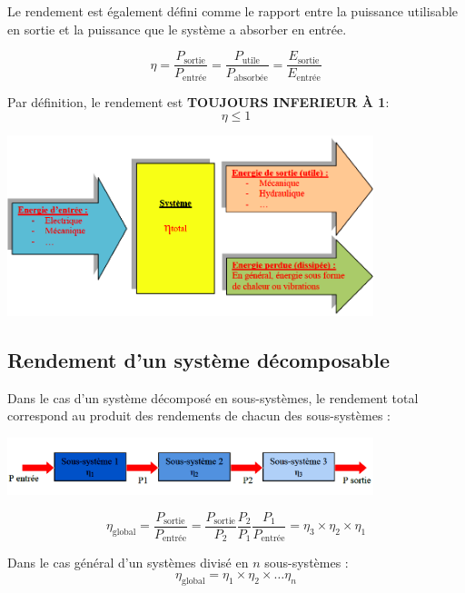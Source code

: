 \documentclass[10pt,fleqn]{article} %
\begin{document}
\begin{defi}
    Le rendement est également défini comme le rapport entre la puissance utilisable en sortie et la puissance que le système a absorber en entrée. 
    
    $$\eta = \frac{P_{\text{sortie}}}{P_{\text{entrée}}} = \frac{P_{\text{utile}}}{P_{\text{absorbée}}} = \frac{E_{\text{sortie}}}{E_{\text{entrée}}}$$
    
\parcoeur Par définition, le rendement est \textbf{TOUJOURS INFERIEUR À 1}: 
$$\eta \leq 1$$
\end{defi}

\begin{center}
    \includegraphics[width=0.8\textwidth]{images/rendement.png}
\end{center}

\subsection{Rendement d'un système décomposable}
Dans le cas d'un système décomposé en sous-systèmes, le rendement total correspond au produit des rendements de chacun des sous-systèmes : 
\begin{center}
    \includegraphics[width=0.8\textwidth]{images/rendement_multiple.png}
\end{center}

\begin{exemple}
    $$\eta_{\text{global}} = \frac{P_{\text{sortie}}}{P_{\text{entrée}}} = \frac{P_{\text{sortie}}}{P_{\text{2}}} \frac{P_{\text{2}}}{P_{\text{1}}} \frac{P_{\text{1}}}{P_{\text{entrée}}} = \eta_3 \times \eta_2 \times \eta_1$$
\end{exemple}
    \begin{defi}
     Dans le cas général d'un systèmes divisé en $n$ sous-systèmes :  
       $$ \eta_{\text{global}} = \eta_1 \times \eta_2 \times \dots \eta_n $$
    \end{defi}
\end{document}
